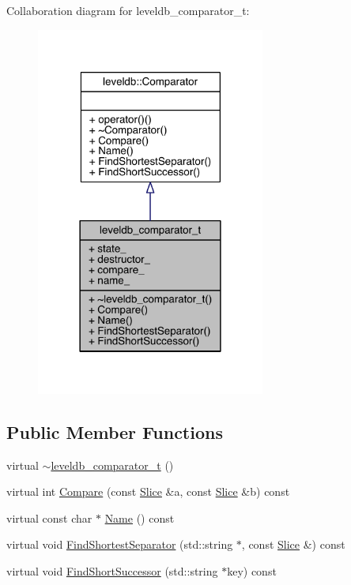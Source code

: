 Collaboration diagram for leveldb\+\_\+comparator\+\_\+t\+:\nopagebreak
\begin{figure}[H]
\begin{center}
\leavevmode
\includegraphics[width=213pt]{structleveldb__comparator__t__coll__graph}
\end{center}
\end{figure}
\subsection*{Public Member Functions}
\begin{DoxyCompactItemize}
\item 
virtual \hyperlink{structleveldb__comparator__t_a6717afb2ab1eebb8402b63f00a6d1c35}{$\sim$leveldb\+\_\+comparator\+\_\+t} ()
\item 
virtual int \hyperlink{structleveldb__comparator__t_af340b22c2639696019e13c7bd153d189}{Compare} (const \hyperlink{classleveldb_1_1_slice}{Slice} \&a, const \hyperlink{classleveldb_1_1_slice}{Slice} \&b) const 
\item 
virtual const char $\ast$ \hyperlink{structleveldb__comparator__t_a3b408bc62e1033237b0ef68cfeac7741}{Name} () const 
\item 
virtual void \hyperlink{structleveldb__comparator__t_abbcfac3b28ea84a6ea347be48e1af2f8}{Find\+Shortest\+Separator} (std\+::string $\ast$, const \hyperlink{classleveldb_1_1_slice}{Slice} \&) const 
\item 
virtual void \hyperlink{structleveldb__comparator__t_ad84aa86465a71203cdfd7cac02d85054}{Find\+Short\+Successor} (std\+::string $\ast$key) const 
\end{DoxyCompactItemize}
